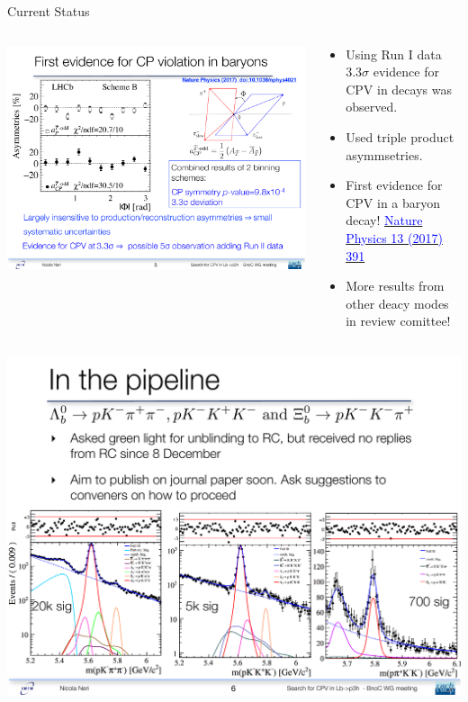 \documentclass{beamer}
\begin{document}
\begin{frame}{Current Status}
  \small
  \begin{columns}
    \begin{column}{.4\textwidth}
      \includegraphics[width=\textwidth]{Run1CPV.pdf}
    \end{column}
    \begin{column}{.65\textwidth}
      \begin{itemize}
      \item Using Run I data $3.3\sigma$ evidence for CPV in \decay{\Lb}{\proton \pim\pip\pim} decays was observed.
      \item Used triple product asymmsetries.
      \item First evidence for CPV in a baryon decay! \href{http://www.nature.com/nphys/journal/v13/n4/full/nphys4021.html}{\textcolor{blue}{Nature Physics 13 (2017) 391}}
      \item More results from other deacy modes in review comittee!
      \end{itemize}
    \end{column}
  \end{columns}
  \begin{center}\includegraphics[width=.75\textwidth]{NewCPVChannels.pdf}\end{center}
\end{frame}
\end{document}
